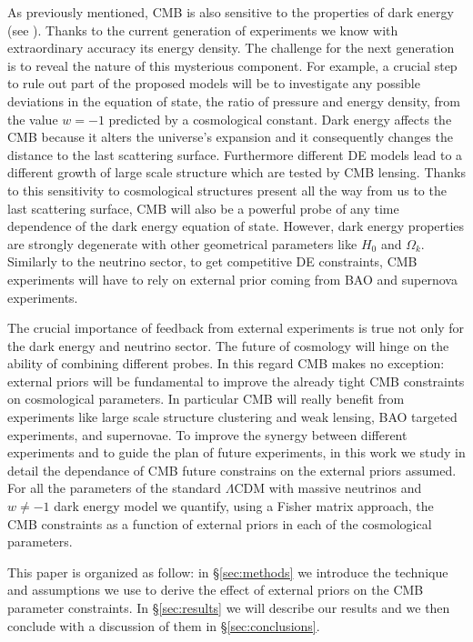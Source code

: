 \documentclass[aps,prd,reprint,superscriptaddress]{revtex4-1}
\newcommand\refsec[1]{\S\ref{sec:#1}}
\begin{document}
As previously mentioned, CMB is also sensitive to the properties of dark energy (see \cite{2010MNRAS.405.2639J}). Thanks to the current generation of experiments we know with extraordinary accuracy its energy density. The challenge for the next generation is to reveal the nature of this mysterious component. For example, a crucial step to rule out part of the proposed models will be to investigate any possible deviations in the equation of state, the ratio of pressure and energy density, from the value $w=-1$ predicted by a cosmological constant. 
Dark energy affects the CMB because it alters the universe's expansion and it consequently changes the distance to the last scattering surface. Furthermore different DE models lead to a different growth of large scale structure which are tested by CMB lensing. Thanks to this sensitivity to cosmological structures present all the way from us to the last scattering surface, CMB will also be a powerful probe of any time dependence of the dark energy equation of state.
However, dark energy properties are strongly degenerate with other geometrical parameters like $H_{0}$ and $\Omega_{k}$. Similarly to the neutrino sector, to get competitive DE constraints, CMB experiments will have to rely on external prior coming from BAO and supernova experiments.

The crucial importance of feedback from external experiments is true not only for the dark energy and neutrino sector. 
The future of cosmology will hinge on the ability of combining different probes. In this regard CMB makes no exception: external priors will be fundamental to improve the already tight CMB constraints on cosmological parameters. 
In particular CMB will really benefit from experiments like large scale structure clustering and weak lensing, BAO targeted experiments, and supernovae. 
To improve the synergy between different experiments and to guide the plan of future experiments, in this work we study in detail the dependance of CMB future constrains on the external priors assumed. For all the parameters of the standard $\Lambda$CDM with massive neutrinos and $w\neq-1$ dark energy model we quantify, using a Fisher matrix approach, the CMB constraints as a function of external priors in each of the cosmological parameters.   
 

This paper is organized as follow: in \refsec{methods} we introduce the technique and assumptions we use to derive the effect of external priors on the CMB parameter constraints. In \refsec{results} we will describe our results and we then conclude with a discussion of them in \refsec{conclusions}.
\end{document}
